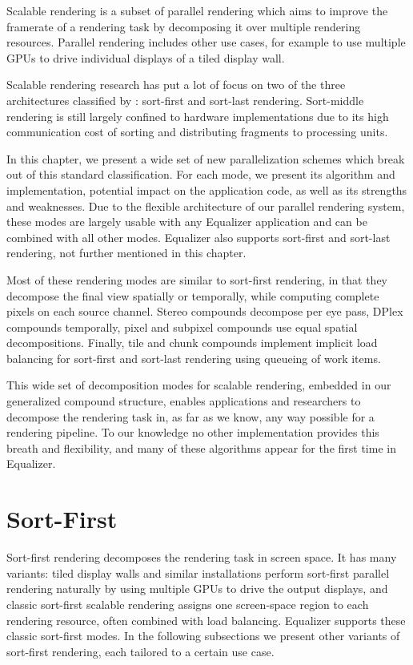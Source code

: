 Scalable rendering is a subset of parallel rendering which aims to improve the
framerate of a rendering task by decomposing it over multiple rendering
resources. Parallel rendering includes other use cases, for example to use
multiple GPUs to drive individual displays of a tiled display wall.


Scalable rendering research has put a lot of focus on two of the three
architectures classified by \cite{Molnar92}: sort-first and sort-last rendering.
Sort-middle rendering is still largely confined to hardware implementations due
to its high communication cost of sorting and distributing fragments to
processing units.

In this chapter, we present a wide set of new parallelization schemes which
break out of this standard classification. For each mode, we present its
algorithm and implementation, potential impact on the application code, as well
as its strengths and weaknesses. Due to the flexible architecture of our
parallel rendering system, these modes are largely usable with any Equalizer
application and can be combined with all other modes. Equalizer also supports
sort-first and sort-last rendering, not further mentioned in this chapter.

Most of these rendering modes are similar to sort-first rendering, in that they
decompose the final view spatially or temporally, while computing complete
pixels on each source channel. Stereo compounds decompose per eye pass, DPlex
compounds temporally, pixel and subpixel compounds use equal spatial
decompositions. Finally, tile and chunk compounds implement implicit
load balancing for sort-first and sort-last rendering using queueing of work
items.

This wide set of decomposition modes for scalable rendering, embedded in our
generalized compound structure, enables applications and researchers to
decompose the rendering task in, as far as we know, any way possible for a
rendering pipeline. To our knowledge no other implementation provides this
breath and flexibility, and many of these algorithms appear for the first time
in Equalizer.

\section{Sort-First}

Sort-first rendering decomposes the rendering task in screen space. It has many
variants: tiled display walls and similar installations perform sort-first
parallel rendering naturally by using multiple GPUs to drive the output
displays, and classic sort-first scalable rendering assigns one screen-space
region to each rendering resource, often combined with load balancing.
Equalizer supports these classic sort-first modes. In the following subsections
we present other variants of sort-first rendering, each tailored to a certain
use case.

